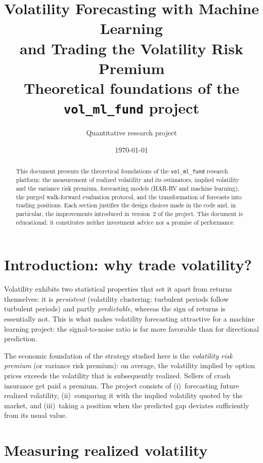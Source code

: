 \documentclass[11pt,a4paper]{article}
\title{Volatility Forecasting with Machine Learning\\
and Trading the Volatility Risk Premium\\
\large Theoretical foundations of the \texttt{vol\_ml\_fund} project}
\author{Quantitative research project}
\date{\today}
\begin{document}
\maketitle

\begin{abstract}
This document presents the theoretical foundations of the
\texttt{vol\_ml\_fund} research platform: the measurement of realized
volatility and its estimators, implied volatility and the variance risk
premium, forecasting models (HAR-RV and machine learning), the purged
walk-forward evaluation protocol, and the transformation of forecasts into
trading positions. Each section justifies the design choices made in the code
and, in particular, the improvements introduced in version~2 of the project.
This document is educational: it constitutes neither investment advice nor a
promise of performance.
\end{abstract}

\tableofcontents

\section{Introduction: why trade volatility?}

Volatility exhibits two statistical properties that set it apart from returns
themselves: it is \emph{persistent} (volatility clustering: turbulent periods
follow turbulent periods) and partly \emph{predictable}, whereas the sign of
returns is essentially not. This is what makes volatility forecasting
attractive for a machine learning project: the signal-to-noise ratio is far
more favorable than for directional prediction.

The economic foundation of the strategy studied here is the \emph{volatility
risk premium} (or variance risk premium): on average, the volatility implied
by option prices exceeds the volatility that is subsequently realized.
Sellers of crash insurance get paid a premium. The project consists of
(i)~forecasting future realized volatility, (ii)~comparing it with the
implied volatility quoted by the market, and (iii)~taking a position when the
predicted gap deviates sufficiently from its usual value.

\section{Measuring realized volatility}
\end{document}
